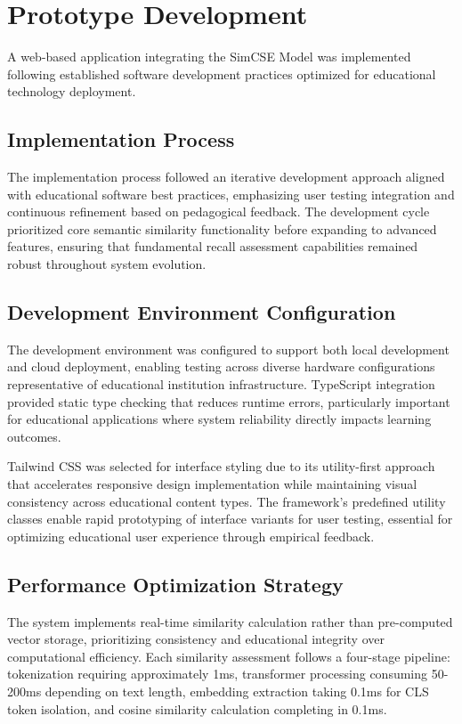 {\color{maroon}
\section{Prototype Development}
\label{sec:prototype_development}

A web-based application integrating the SimCSE Model was implemented following established software development practices optimized for educational technology deployment.

\subsection{Implementation Process}

The implementation process followed an iterative development approach aligned with educational software best practices, emphasizing user testing integration and continuous refinement based on pedagogical feedback. The development cycle prioritized core semantic similarity functionality before expanding to advanced features, ensuring that fundamental recall assessment capabilities remained robust throughout system evolution.

\subsection{Development Environment Configuration}

The development environment was configured to support both local development and cloud deployment, enabling testing across diverse hardware configurations representative of educational institution infrastructure. TypeScript integration provided static type checking that reduces runtime errors, particularly important for educational applications where system reliability directly impacts learning outcomes.

Tailwind CSS was selected for interface styling due to its utility-first approach that accelerates responsive design implementation while maintaining visual consistency across educational content types. The framework's predefined utility classes enable rapid prototyping of interface variants for user testing, essential for optimizing educational user experience through empirical feedback.

\subsection{Performance Optimization Strategy}

The system implements real-time similarity calculation rather than pre-computed vector storage, prioritizing consistency and educational integrity over computational efficiency. Each similarity assessment follows a four-stage pipeline: tokenization requiring approximately 1ms, transformer processing consuming 50-200ms depending on text length, embedding extraction taking 0.1ms for CLS token isolation, and cosine similarity calculation completing in 0.1ms.

}
